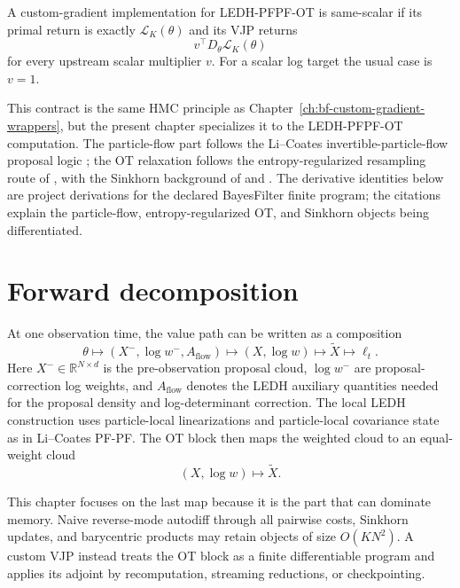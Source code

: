 \begin{definition}
\label{def:bf-ledh-ot-same-scalar}
A custom-gradient implementation for LEDH-PFPF-OT is same-scalar if its primal
return is exactly \(\mathcal L_K(\theta)\) and its VJP returns
\[
  v^\top D_\theta \mathcal L_K(\theta)
\]
for every upstream scalar multiplier \(v\).  For a scalar log target the usual
case is \(v=1\).
\end{definition}

This contract is the same HMC principle as Chapter~\ref{ch:bf-custom-gradient-wrappers},
but the present chapter specializes it to the LEDH-PFPF-OT computation.  The
particle-flow part follows the Li--Coates invertible-particle-flow proposal
logic \citep{li2017particle}; the OT relaxation follows the entropy-regularized
resampling route of \citet{corenflos2021differentiable}, with the Sinkhorn
background of \citet{cuturi2013sinkhorn} and
\citet{peyre2019computational}.
The derivative identities below are project derivations for the declared
BayesFilter finite program; the citations explain the particle-flow,
entropy-regularized OT, and Sinkhorn objects being differentiated.

\section{Forward decomposition}
\label{sec:bf-ledh-ot-forward-decomposition}

At one observation time, the value path can be written as a composition
\begin{equation}
\label{eq:bf-ledh-ot-forward-composition}
  \theta
  \longmapsto
  (X^-, \log w^-, A_{\mathrm{flow}})
  \longmapsto
  (X, \log w)
  \longmapsto
  \widetilde X
  \longmapsto
  \ell_t .
\end{equation}
Here \(X^-\in\mathbb R^{N\times d}\) is the pre-observation proposal cloud,
\(\log w^-\) are proposal-correction log weights, and
\(A_{\mathrm{flow}}\) denotes the LEDH auxiliary quantities needed for the
proposal density and log-determinant correction.  The local LEDH construction
uses particle-local linearizations and particle-local covariance state as in
Li--Coates PF-PF.  The OT block then maps the weighted cloud to an equal-weight
cloud
\[
  (X,\log w) \longmapsto \widetilde X.
\]

This chapter focuses on the last map because it is the part that can dominate
memory.  Naive reverse-mode autodiff through all pairwise costs, Sinkhorn
updates, and barycentric products may retain objects of size \(O(KN^2)\).  A
custom VJP instead treats the OT block as a finite differentiable program and
applies its adjoint by recomputation, streaming reductions, or checkpointing.

